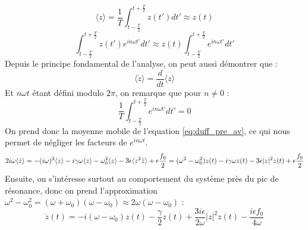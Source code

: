 \begin{equation}
    \langle z \rangle = \frac{1}{T}\int_{t-\frac{T}{2}}^{t+\frac{T}{2}}{z(t')}dt' \approx  z(t)
\end{equation}
\begin{equation}
    \int_{t-\frac{T}{2}}^{t+\frac{T}{2}}{z(t')e^{in\omega t'}}dt'  \approx z(t) \int_{t-\frac{T}{2}}^{t+\frac{T}{2}}{e^{in\omega t'}}dt'
\end{equation}
%
Depuis le principe fondamental de l'analyse, on peut aussi démontrer que :
%
\begin{equation}
    \langle \dot{z} \rangle = \frac{d}{dt} \langle z \rangle
\end{equation}
%
Et $n \omega t$ étant défini modulo $2\pi$, on remarque que pour $n \neq 0$ :
\begin{equation*}
    \frac{1}{T}\int_{t-\frac{T}{2}}^{t+\frac{T}{2}}{e^{in\omega t'}}dt' = 0
\end{equation*}
%
On prend donc la moyenne mobile de l'equation \eqref{eq:duff_pre_av}, 
ce qui nous permet de négliger les facteurs de $e^{i n\omega t}$.
\begin{dmath}
    2i\omega \langle \dot{z} \rangle = - (i\omega)^2 \langle z \rangle
    - i\gamma\omega \langle z \rangle
    - \omega_0^2 \langle z \rangle 
    - 3 \epsilon \langle z^2 \bar{z} \rangle
    + \epsilon \frac{f_0}{2} \\
    = (\omega^2 - \omega_0^2)z(t) - i\gamma\omega z(t) - 3\epsilon |z|^2 z(t) + \epsilon \frac{f_0}{2}
\end{dmath}
%
Ensuite, on s'intéresse surtout au comportement du système près du pic de résonance, 
donc on prend l'approximation $\omega^2 - \omega_0^2 = (\omega + \omega_0)(\omega - \omega_0) \approx 2\omega(\omega - \omega_0)$ :
%
\begin{dmath}
    \dot{z}(t) = -i(\omega - \omega_0)z(t)
    - \frac{\gamma}{2} z(t) + \frac{3i\epsilon}{2\omega}|z|^2z(t) - \frac{i\epsilon f_0}{4\omega}
\end{dmath}
%
